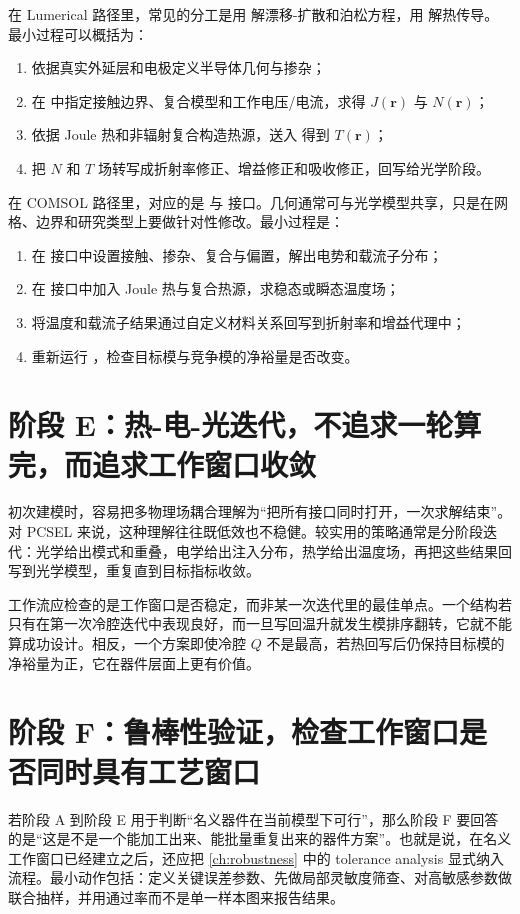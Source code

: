 在 Lumerical 路径里，常见的分工是用  解漂移-扩散和泊松方程，用  解热传导。最小过程可以概括为：
\begin{enumerate}
  \item 依据真实外延层和电极定义半导体几何与掺杂；
  \item 在  中指定接触边界、复合模型和工作电压/电流，求得 $J(\mathbf{r})$ 与 $N(\mathbf{r})$；
  \item 依据 Joule 热和非辐射复合构造热源，送入  得到 $T(\mathbf{r})$；
  \item 把 $N$ 和 $T$ 场转写成折射率修正、增益修正和吸收修正，回写给光学阶段。
\end{enumerate}

在 COMSOL 路径里，对应的是  与  接口。几何通常可与光学模型共享，只是在网格、边界和研究类型上要做针对性修改。最小过程是：
\begin{enumerate}
  \item 在  接口中设置接触、掺杂、复合与偏置，解出电势和载流子分布；
  \item 在  接口中加入 Joule 热与复合热源，求稳态或瞬态温度场；
  \item 将温度和载流子结果通过自定义材料关系回写到折射率和增益代理中；
  \item 重新运行 ，检查目标模与竞争模的净裕量是否改变。
\end{enumerate}

\section{阶段 E：热-电-光迭代，不追求一轮算完，而追求工作窗口收敛}
初次建模时，容易把多物理场耦合理解为“把所有接口同时打开，一次求解结束”。对 PCSEL 来说，这种理解往往既低效也不稳健。较实用的策略通常是分阶段迭代：光学给出模式和重叠，电学给出注入分布，热学给出温度场，再把这些结果回写到光学模型，重复直到目标指标收敛。

工作流应检查的是工作窗口是否稳定，而非某一次迭代里的最佳单点。一个结构若只有在第一次冷腔迭代中表现良好，而一旦写回温升就发生模排序翻转，它就不能算成功设计。相反，一个方案即使冷腔 $Q$ 不是最高，若热回写后仍保持目标模的净裕量为正，它在器件层面上更有价值。

\section{阶段 F：鲁棒性验证，检查工作窗口是否同时具有工艺窗口}
若阶段 A 到阶段 E 用于判断“名义器件在当前模型下可行”，那么阶段 F 要回答的是“这是不是一个能加工出来、能批量重复出来的器件方案”。也就是说，在名义工作窗口已经建立之后，还应把 \cref{ch:robustness} 中的 tolerance analysis 显式纳入流程。最小动作包括：定义关键误差参数、先做局部灵敏度筛查、对高敏感参数做联合抽样，并用通过率而不是单一样本图来报告结果。

